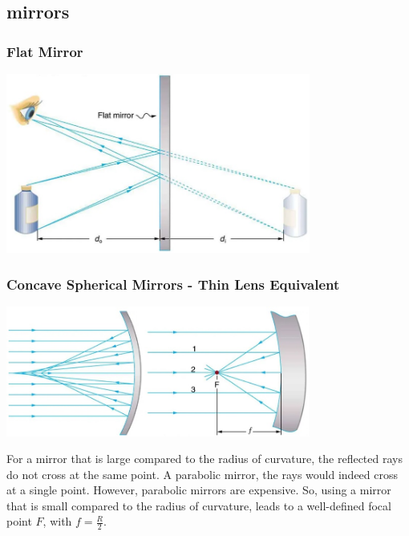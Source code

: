 \documentclass{beamer}
\begin{document}
\subsection{mirrors}

\begin{frame}\frametitle{Flat Mirror}

\begin{center}
\includegraphics[width=10cm]{fig/mirrorimage1.jpg}
\end{center}

\end{frame}

\begin{frame}\frametitle{Concave Spherical Mirrors - Thin Lens Equivalent}

\begin{center}
\includegraphics[width=10cm]{fig/mirrorimage2.jpg}
\end{center}

For a mirror that is large compared to the radius of curvature, the reflected rays do not cross at the same point. A parabolic mirror, the rays would indeed cross at a single point. However, parabolic mirrors are expensive. So, using a mirror that is small compared to the radius of curvature, leads to a well-defined focal point $F$, with $f = \frac{R}{2}$.

\end{frame}
\end{document}

